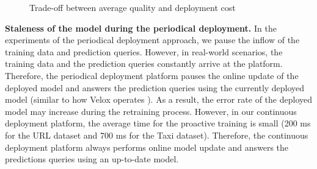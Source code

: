 \begin{figure}[!h]
\centering
\resizebox{\columnwidth}{!}{}
\caption{Trade-off between average quality and deployment cost}
\label{trade-off-figure}
\end{figure}

\textbf{Staleness of the model during the periodical deployment.}
In the experiments of the periodical deployment approach, we pause the inflow of the training data and prediction queries.
However, in real-world scenarios, the training data and the prediction queries constantly arrive at the platform.
Therefore, the periodical deployment platform pauses the online update of the deployed model and answers the prediction queries using the currently deployed model (similar to how Velox operates \cite{crankshaw2014missing}).
As a result, the error rate of the deployed model may increase during the retraining process.
However, in our continuous deployment platform, the average time for the proactive training is small (200 ms for the URL dataset and 700 ms for the Taxi dataset).
Therefore, the continuous deployment platform always performs online model update and answers the predictions queries using an up-to-date model.